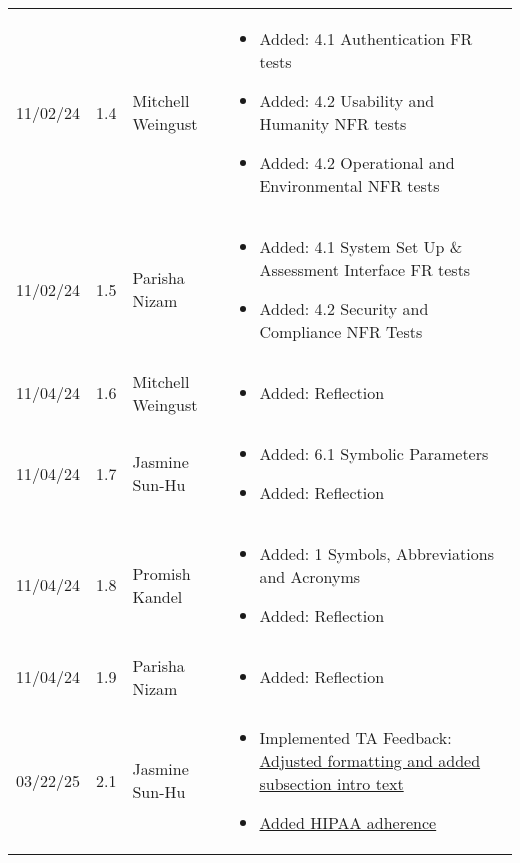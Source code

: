 \documentclass[12pt, titlepage]{article}
\begin{document}
\begin{longtable}{p{2cm}p{1cm}p{4cm}p{8cm}}
11/02/24 & 1.4 & Mitchell Weingust &
\begin{itemize}[noitemsep, topsep=0pt]
  \item Added: 4.1 Authentication FR tests
  \item Added: 4.2 Usability and Humanity NFR tests
  \item Added: 4.2 Operational and Environmental NFR tests
\end{itemize} \\

11/02/24 & 1.5 & Parisha Nizam &
\begin{itemize}[noitemsep, topsep=0pt]
  \item Added: 4.1 System Set Up \& Assessment Interface FR tests
  \item Added: 4.2 Security and Compliance NFR Tests
\end{itemize} \\

11/04/24 & 1.6 & Mitchell Weingust &
\begin{itemize}[noitemsep, topsep=0pt]
  \item Added: Reflection
\end{itemize} \\

11/04/24 & 1.7 & Jasmine Sun-Hu &
\begin{itemize}[noitemsep, topsep=0pt]
  \item Added: 6.1 Symbolic Parameters
  \item Added: Reflection
\end{itemize} \\

11/04/24 & 1.8 & Promish Kandel &
\begin{itemize}[noitemsep, topsep=0pt]
  \item Added: 1 Symbols, Abbreviations and Acronyms
  \item Added: Reflection
\end{itemize} \\

11/04/24 & 1.9 & Parisha Nizam &
\begin{itemize}[noitemsep, topsep=0pt]
  \item Added: Reflection
\end{itemize} \\

03/22/25 & 2.1 & Jasmine Sun-Hu &
\begin{itemize}[noitemsep, topsep=0pt]
  \item Implemented TA Feedback: \href{https://github.com/parishanizam/TeleHealth/issues/292}{Adjusted formatting and added subsection intro text}
  \item \href{https://github.com/parishanizam/TeleHealth/issues/293}{Added HIPAA adherence}
\end{itemize} \\


\end{longtable}
\end{document}
